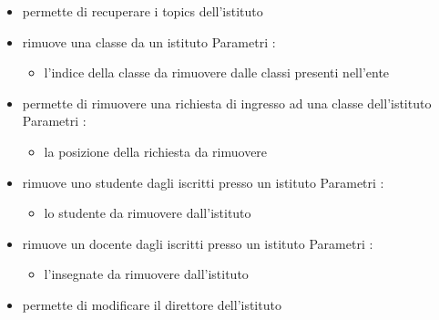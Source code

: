 \begin{itemize}
\begin{itemize}
\item {}
\newline
permette di recuperare i topics dell'istituto
\newline
\item {}
\newline
rimuove una classe da un istituto
\newline
Parametri :
\begin{itemize}
\item {}
\newline
l'indice della classe da rimuovere dalle classi presenti nell'ente
\end{itemize}
\item {}
\newline
permette di rimuovere una richiesta di ingresso ad una classe dell'istituto
\newline
Parametri :
\begin{itemize}
\item {}
\newline
la posizione della richiesta da rimuovere
\end{itemize}
\item {}
\newline
rimuove uno studente dagli iscritti presso un istituto
\newline
Parametri :
\begin{itemize}
\item {}
\newline
lo studente da rimuovere dall'istituto
\end{itemize}
\item {}
\newline
rimuove un docente dagli iscritti presso un istituto
\newline
Parametri :
\begin{itemize}
\item {}
\newline
l'insegnate da rimuovere dall'istituto
\end{itemize}
\item {}
\newline
permette di modificare il direttore dell'istituto

\end{itemize}
\end{itemize}
